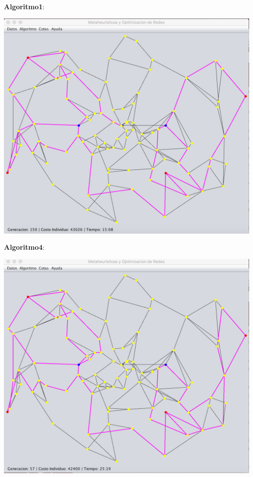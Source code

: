 \documentclass{extarticle}
\begin{document}
\textbf{Algoritmo1}:
\begin{center}
	\includegraphics[scale=0.4]{img/metaheuristica/i2_s1}
\end{center}
\newpage
\textbf{Algoritmo4}:
\begin{center}
	\includegraphics[scale=0.4]{img/metaheuristica/i2_s4}
\end{center}
\end{document}

